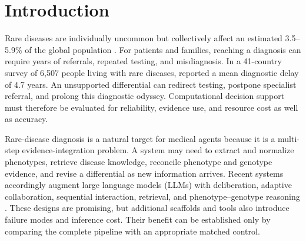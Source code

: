 \documentclass[letterpaper]{article} %
\begin{document}



\section{Introduction}
\label{sec:introduction}

Rare diseases are individually uncommon but collectively affect an estimated
3.5--5.9\% of the global population
\citep{NguengangWakap2020Prevalence}. For patients and families, reaching a
diagnosis can require years of referrals, repeated testing, and
misdiagnosis. In a 41-country survey of 6,507 people living with rare
diseases, \citet{Faye2024DiagnosisDelay} reported a mean diagnostic delay of
4.7 years. An unsupported differential can redirect testing, postpone
specialist referral, and prolong this diagnostic odyssey. Computational
decision support must therefore be evaluated for reliability, evidence use,
and resource cost as well as accuracy.

Rare-disease diagnosis is a natural target for medical agents because it is a
multi-step evidence-integration problem. A system may need to extract and
normalize phenotypes, retrieve disease knowledge, reconcile phenotype and
genotype evidence, and revise a differential as new information arrives.
Recent systems accordingly augment large language models (LLMs) with
deliberation, adaptive collaboration, sequential interaction, retrieval, and
phenotype--genotype reasoning
\citep{tang2024medagents,kim2024mdagents,nori2025sequential,
schmidgall2026agentclinic,zhao2026deeprare,liu2026vcrdagent}. These designs
are promising, but additional scaffolds and tools also introduce failure
modes and inference cost. Their benefit can be established only by comparing
the complete pipeline with an appropriate matched control.
\end{document}
